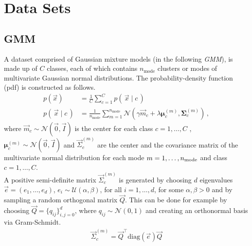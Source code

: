 \section{Data Sets}
\label{sec:datasets}

\subsection{GMM}
\label{sec:datasetgmm}
A dataset comprised of Gaussian mixture models (in the following \textit{GMM}), 
is made up of $C$ classes, 
each of which contains $n_\text{mode}$ clusters or modes of multivariate Gaussian normal distributions. 
The probability-density function (pdf) is constructed as follows.
\begin{align}
\label{eqn:gmm_distr}
    p(\vec x) &= \frac 1 C \sum_{c=1}^C p(\, \vec x \mid c \,) \nonumber\\
    p(\, \vec x \mid c \,) &= \frac 1 {n_\text{mode}} \sum _{m=1}^{n_\text{mode}}
    \mathcal N (\gamma \vec m_c + \lambda \boldsymbol \mu_c^{(m)}, \boldsymbol \Sigma_c^{(m)}) \, ,
\end{align}
where 
$\vec m_c \sim \mathcal N (\vec 0, \vec I)$ is the center for each class $c=1,\ldots, C$ ,
$\boldsymbol \mu_c^{(m)} \sim \mathcal N (\vec 0, \vec I)$ and
$\vec \Sigma_c^{(m)}$ are the center and the covariance matrix of the multivariate normal distribution
for each mode $m=1,\ldots, n_{\textnormal{mode}}$ and class $c=1,\ldots, C$.  \\
A positive semi-definite matrix $\vec \Sigma_c^{(m)}$ is generated by choosing $d$ eigenvalues $\vec e = (e_1, \ldots, e_d)$, $e_i \sim \mathcal U(\alpha, \beta)$, for all $i=1, \ldots, d$, for some $\alpha, \beta > 0$ and 
by sampling a random orthogonal matrix $\vec Q$. 
This can be done for example by choosing $\vec Q = \{q_{ij}\}_{i,j=0}^{d}$, 
where $q_{ij} \sim \mathcal N(0, 1)$
and creating an orthonormal basis via Gram-Schmidt. 
\begin{align*}
    \vec \Sigma_c^{(m)} = \vec Q^\top \text{diag}(\vec e) \vec Q
\end{align*}

